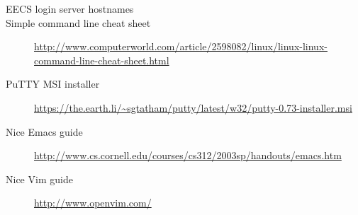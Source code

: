 \documentclass{tufte-handout}
\def\PuTTYurl{https://the.earth.li/~sgtatham/putty/latest/w32/putty-0.73-installer.msi}
\begin{document}
\begin{description}

\item[EECS login server hostnames]
\LabHostnamesLink

\item[Simple command line cheat sheet]
\url{http://www.computerworld.com/article/2598082/linux/linux-linux-command-line-cheat-sheet.html}

\item[PuTTY MSI installer]
\url{\PuTTYurl}

\item[Nice Emacs guide]
\url{http://www.cs.cornell.edu/courses/cs312/2003sp/handouts/emacs.htm}

\item[Nice Vim guide]
\url{http://www.openvim.com/}

\end{description}
\end{document}

